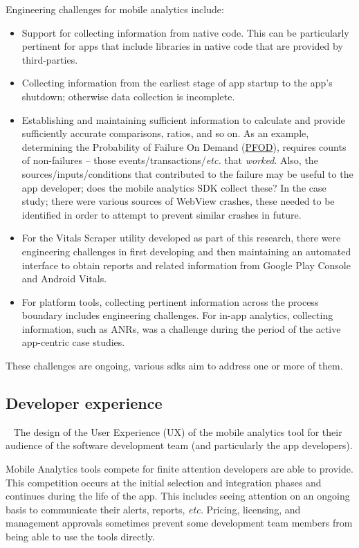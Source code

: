 Engineering challenges for mobile analytics include:
\begin{itemize}
    \item Support for collecting information from native code. This can be particularly pertinent for apps that include libraries in native code that are provided by third-parties.
    \item Collecting information from the earliest stage of app startup to the app's shutdown; otherwise data collection is incomplete.
    \item Establishing and maintaining sufficient information to calculate and provide sufficiently accurate comparisons, ratios, and so on. As an example, determining the Probability of Failure On Demand (\href{glossary-pfod}{PFOD}), requires counts of non-failures -- those events/transactions/\emph{etc.} that \emph{worked}. Also, the sources/inputs/conditions that contributed to the failure may be useful to the app developer; does the mobile analytics SDK collect these? In the  case study; there were various sources of WebView crashes, these needed to be identified in order to attempt to prevent similar crashes in future.
    \item For the Vitals Scraper utility developed as part of this research, there were engineering challenges in first developing and then maintaining an automated interface to obtain reports and related information from Google Play Console and Android Vitals.
    \item For platform tools, collecting pertinent information across the process boundary includes engineering challenges. For in-app analytics, collecting information, such as ANRs, was a challenge during the period of the active app-centric case studies. 
\end{itemize}

These challenges are ongoing, various \Glspl{sdk} aim to address one or more of them.

\subsection{Developer experience}~\label{tata-developer-experience-ux-design}
The design of the User Experience (UX) of the mobile analytics tool for their audience of the software development team (and particularly the app developers).


Mobile Analytics tools compete for finite attention developers are able to provide. This competition occurs at the initial selection and integration phases and continues during the life of the app. This includes seeing attention on an ongoing basis  to communicate their alerts, reports, \emph{etc.} Pricing, licensing, and management approvals sometimes prevent some development team members from being able to use the tools directly.

